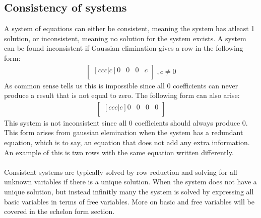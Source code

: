\documentclass[11pt, a4paper]{article}
\begin{document}
\subsection{Consistency of systems}
A system of equations can either be consistent, meaning the system has atleast 1 solution, or 
inconsistent, meaning no solution for the system excists. A system can be found 
inconsistent if Gaussian elimination gives a row in the following form:
\begin{align*}
    \begin{bmatrix}[ccc|c]
        0 & 0 & 0 & c\\
    \end{bmatrix}
    \;, c \neq 0
\end{align*}
As common sense tells us this is impossible since all 0 coefficients can never produce
a result that is not equal to zero. The following form can also arise:
\begin{align*}
    \begin{bmatrix}[ccc|c]
        0 & 0 & 0 & 0\\
    \end{bmatrix}
\end{align*}
This system is not inconsistent since all 0 coefficients should always produce 0. This form arises from 
gaussian elemination when the system has a redundant equation, which is to say, an equation that does not
add any extra information. An example of this is two rows with the same equation written differently.\\
\\
Consistent systems are typically solved by row reduction and solving for all unknown variables if there is a unique
solution. When the system does not have a unique solution, but instead infinitly many the system is solved by expressing
all basic variables in terms of free variables. More on basic and free variables will be covered in the echelon form section.
\end{document}

